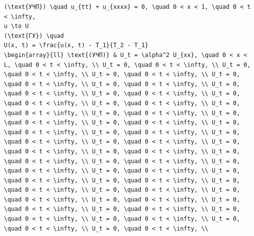 \documentclass[
  ukrainian,
]{article}
\begin{document}
\begin{verbatim}
(\text{УЧП}) \quad u_{tt} + u_{xxxx} = 0, \quad 0 < x < 1, \quad 0 < t < \infty,
u \to U
(\text{ГУ}) \quad
U(x, t) = \frac{u(x, t) - T_1}{T_2 - T_1}
\begin{array}{ll} \text{(УЧП)} & U_t = \alpha^2 U_{xx}, \quad 0 < x < L, \quad 0 < t < \infty, \\ U_t = 0, \quad 0 < t < \infty, \\ U_t = 0, \quad 0 < t < \infty, \\ U_t = 0, \quad 0 < t < \infty, \\ U_t = 0, \quad 0 < t < \infty, \\ U_t = 0, \quad 0 < t < \infty, \\ U_t = 0, \quad 0 < t < \infty, \\ U_t = 0, \quad 0 < t < \infty, \\ U_t = 0, \quad 0 < t < \infty, \\ U_t = 0, \quad 0 < t < \infty, \\ U_t = 0, \quad 0 < t < \infty, \\ U_t = 0, \quad 0 < t < \infty, \\ U_t = 0, \quad 0 < t < \infty, \\ U_t = 0, \quad 0 < t < \infty, \\ U_t = 0, \quad 0 < t < \infty, \\ U_t = 0, \quad 0 < t < \infty, \\ U_t = 0, \quad 0 < t < \infty, \\ U_t = 0, \quad 0 < t < \infty, \\ U_t = 0, \quad 0 < t < \infty, \\ U_t = 0, \quad 0 < t < \infty, \\ U_t = 0, \quad 0 < t < \infty, \\ U_t = 0, \quad 0 < t < \infty, \\ U_t = 0, \quad 0 < t < \infty, \\ U_t = 0, \quad 0 < t < \infty, \\ U_t = 0, \quad 0 < t < \infty, \\ U_t = 0, \quad 0 < t < \infty, \\ U_t = 0, \quad 0 < t < \infty, \\ U_t = 0, \quad 0 < t < \infty, \\ U_t = 0, \quad 0 < t < \infty, \\ U_t = 0, \quad 0 < t < \infty, \\ U_t = 0, \quad 0 < t < \infty, \\ U_t = 0, \quad 0 < t < \infty, \\ U_t = 0, \quad 0 < t < \infty, \\ U_t = 0, \quad 0 < t < \infty, \\ U_t = 0, \quad 0 < t < \infty, \\ U_t = 0, \quad 0 < t < \infty, \\ 
\end{verbatim}
\end{document}
